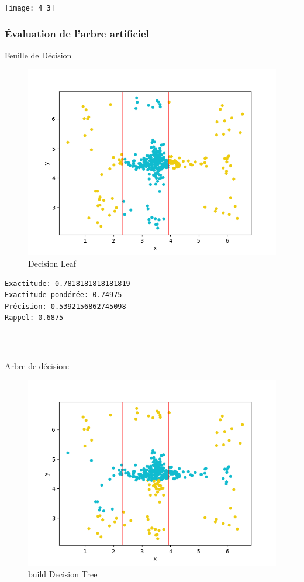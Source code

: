 \documentclass[a4paper]{article}
\begin{document}
\texttt{[image: 4\_3]}


\subsubsection{Évaluation de l'arbre artificiel}


Feuille de Décision

\begin{figure}[htbp]
\centering
\includegraphics{eval1.png}
\caption{Decision Leaf}
\end{figure}

\begin{verbatim}
Exactitude: 0.7818181818181819
Exactitude pondérée: 0.74975
Précision: 0.5392156862745098
Rappel: 0.6875
\end{verbatim}

\newpage
\\
\begin{center}\rule{3in}{0.4pt}\end{center}

Arbre de décision:

\begin{figure}[]
\centering
\includegraphics{eval2.png}
\caption{build Decision Tree}
\end{figure}
\end{document}
